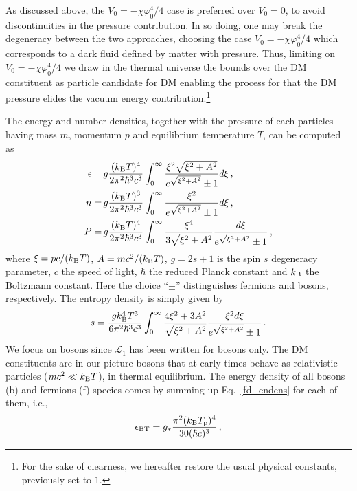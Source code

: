 \documentclass[twocolumn,showpacs, nofootinbib,aps,superscriptaddress, eqsecnum,prd,prl,notitlepage,showkeys,10pt,reprint]{revtex4-1}
\begin{document}
As discussed above, the $V_0= -\chi\varphi_0^4/4$ case is preferred over $V_0=0$, to avoid discontinuities in the pressure contribution. In so doing, one may break the degeneracy between the two approaches, choosing the case $V_0= -\chi\varphi_0^4/4$ which corresponds to a dark fluid defined by matter with pressure.
Thus, limiting on  $V_0= -\chi\varphi_0^4/4$ we draw in the thermal universe the bounds over the DM constituent as particle candidate for DM enabling the process for that the DM pressure elides the vacuum energy contribution.\footnote{
For the sake of clearness, we hereafter restore the usual physical constants, previously set to $1$.}

The energy and number densities, together with the pressure of each particles having mass $m$, momentum $p$ and equilibrium temperature $T$, can be computed as \cite{2008cosm.book.....W}
%
\begin{align}
\label{fd_endens}
\epsilon=&\,g\frac{(k_{\rm B}T)^4}{2\pi^2\hbar^3c^3}\int^{\infty}_{0}\frac{\xi^2\sqrt{\xi^2+A^2}}{e^{\sqrt{\xi^2+A^2}}\pm1}d\xi\,,\\
\label{fd_partdens}
n=&\,g\frac{(k_{\rm B}T)^3}{2\pi^2\hbar^3c^3}\int^{\infty}_{0}\frac{\xi^2}{e^{\sqrt{\xi^2+A^2}}\pm1}d\xi\,,\\
\label{fd_pressdens}
P=&\,g\frac{(k_{\rm B}T)^4}{2\pi^2\hbar^3c^3}\int^{\infty}_{0}\frac{\xi^4}{3\sqrt{\xi^2+A^2}}\frac{d\xi}{e^{\sqrt{\xi^2+A^2}}\pm1}\,,
\end{align}
%
where $\xi=pc/(k_{\rm B}T)$, $A=mc^2/(k_{\rm B}T)$, $g=2s+1$ is the spin $s$ degeneracy parameter, $c$ the speed of light, $\hbar$ the reduced Planck constant and $k_{\rm B}$ the Boltzmann constant. Here the choice ``$\pm$'' distinguishes fermions and bosons, respectively.
The entropy density is simply given by
%
\begin{equation}
\label{fd_entrdens}
s=\frac{g k_{\rm B}^4T^3}{6\pi^2\hbar^3c^3}\int^{\infty}_{0}\frac{4\xi^2+3A^2}{\sqrt{\xi^2+A^2}}\frac{\xi^2d\xi}{e^{\sqrt{\xi^2+A^2}}\pm1}\,.
\end{equation}
%
We focus on bosons since $\mathcal L_1$  has been written for bosons only. The DM constituents are in our picture bosons that at early times behave as relativistic particles ($mc^2\ll k_{\rm B}T$), in thermal equilibrium.
The energy density of all bosons (b) and fermions (f) species comes by summing up Eq.~\eqref{fd_endens} for each of them, i.e.,
\begin{equation}
\label{endenstot2}
\epsilon_{\rm BT}=g_{*}\frac{\pi^2(k_{\rm B}T_{\rm p})^4}{30(\hbar c)^3}\,,
\end{equation}
\end{document}
